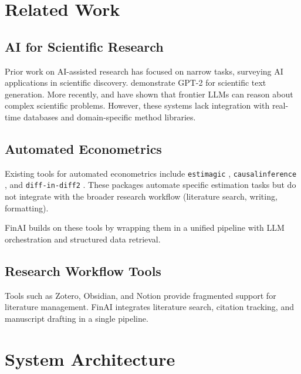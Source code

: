 \documentclass[12pt, a4paper]{article}
\begin{document}
\section{Related Work}

\subsection{AI for Scientific Research}

Prior work on AI-assisted research has focused on narrow tasks, surveying AI applications in scientific discovery. \cite{wang2019arxiv} demonstrate GPT-2 for scientific text generation. More recently, \cite{gpt4_2023} and \cite{claude_2024} have shown that frontier LLMs can reason about complex scientific problems. However, these systems lack integration with real-time databases and domain-specific method libraries.

\subsection{Automated Econometrics}

Existing tools for automated econometrics include \texttt{estimagic} \citep{estimagic}, \texttt{causalinference} \citep{causalinference}, and \texttt{diff-in-diff2} \citep{diffindiff2}. These packages automate specific estimation tasks but do not integrate with the broader research workflow (literature search, writing, formatting).

FinAI builds on these tools by wrapping them in a unified pipeline with LLM orchestration and structured data retrieval.

\subsection{Research Workflow Tools}

Tools such as Zotero, Obsidian, and Notion provide fragmented support for literature management. FinAI integrates literature search, citation tracking, and manuscript drafting in a single pipeline.

\section{System Architecture}
\end{document}
